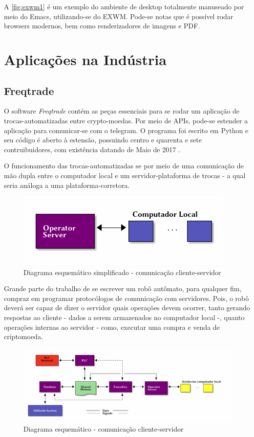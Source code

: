 \documentclass[
12pt,				%
openright,			%
oneside,			%
a4paper,			%
english,			%
french,				%
spanish,			%
brazil,				%
]{abntex2}
\begin{document}
A \autoref{fig:exwm1} é um exemplo do ambiente de desktop totalmente manuseado por meio do Emacs, utilizando-se do EXWM. Pode-se notas que é possível rodar browsers modernos, bem como renderizadores de imagens e PDF.

\section{Aplicações na Indústria}
\subsection{Freqtrade}
O software \emph{Freqtrade} contém as peças essenciais para se rodar
um aplicação de trocas-automatizadas entre crypto-moedas. Por meio de
APIs, pode-se estender a aplicação para comunicar-se com o
telegram. O programa foi escrito em Python e seu código é aberto à
estensão, possuindo centro e quarenta e sete contruibuidores, com existência datando de Maio de 2017 \cite{fang2020cryptocurrency}.

O funcionamento das trocas-automatizadas se por meio de uma
comunicação de mão dupla entre o computador local e um
servidor-plataforma de trocas - a qual seria análoga a uma
plataforma-corretora.

\begin{figure}[ht]
  \centering
  \caption{\label{fig:diagrama-freqtrade} Diagrama esquemático simplificado -
    comunicação cliente-servidor}
  \includegraphics[width=0.6\linewidth]{Imagens/server-client-fq_4.png}
\end{figure}

Grande parte do trabalho de se escrever um robô autômato, para
qualquer fim, compraz em programar protocólogos de comunicação com
servidores. Pois, o robô deverá ser capaz de dizer o servidor quais
operações devem ocorrer, tanto gerando respostas ao cliente - dados a
serem armazenados no computador local -, quanto operações internas ao
servidor - como, executar uma compra e venda de criptomoeda.

\begin{figure}[ht]
  \centering
  \caption{\label{fig:diagrama-freqtrade2} Diagrama esquemático -
    comunicação cliente-servidor}
  \includegraphics[width=1\linewidth]{ditaa_4.png}
\end{figure}
\end{document}
